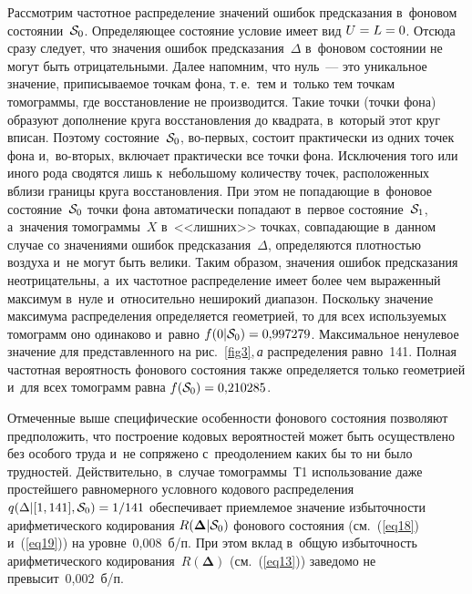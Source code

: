 \begin{multicols}{2}
Рассмотрим частотное распределение значений ошибок предсказания в~фоновом 
состоянии~${\cal S}_0$. Определяющее состояние условие имеет вид $U\hm=L\hm=0$. 
Отсюда сразу следует, что значения ошибок предсказания~$\Delta$  в~фоновом 
состоянии не могут быть отрицательными. Далее напомним, что нуль~--- 
это уникальное значение, приписываемое точкам фона, т.\,е.\ 
тем и~только тем точкам томограммы, где вос\-ста\-нов\-ле\-ние не производится. 
Такие точки (точки фона) образуют дополнение круга восстановления до квадрата, 
в~который этот круг вписан. Поэтому состояние~${\cal S}_0$, во-пер\-вых, 
состоит практически из одних точек фона и,~во-вто\-рых, включает практически 
все точки фона. Исключения того или иного рода сводятся лишь к~небольшому 
количеству точек, расположенных вблизи границы круга восстановления. 
При этом не попадающие в~фоновое состояние~${\cal S}_0$ точки фона автоматически 
попадают в~первое состояние~${\cal S}_1$, а~значения томограммы~$X$ в~<<лишних>> 
точках, совпадающие в~данном случае со значениями ошибок предсказания~$\Delta$, 
определяются плот\-ностью воздуха и~не могут быть велики. Таким образом, значения 
ошибок предсказания неотрицательны, а~их частотное распределение имеет более 
чем выраженный максимум в~нуле и~относительно неширокий диапазон. Поскольку 
значение максимума распределения определяется геометрией, то для всех используемых 
томограмм оно одинаково и~равно $f(0|{\cal S}_0)\hm= 0{,}997279$. 
Максимальное ненулевое значение для представленного на рис.~\ref{fig3},\,\textit{а} 
распределения равно~141. Полная частотная вероятность фонового состояния также 
определяется только геометрией и~для всех томограмм равна $f({\cal S}_0)\hm= 
0{,}210285$.
{

}



Отмеченные выше специфические особенности фонового состояния 
позволяют предположить, что построение кодовых вероятностей может быть 
осуществлено без особого труда и~не сопряжено с~преодолением каких бы то 
ни было трудностей. Действительно, в~случае томограммы~Т1 использование 
даже простейшего равномерного условного кодового распределения 
$q(\Delta|[1,141],{\cal S}_0)\hm=1/141$ обеспечивает приемлемое значение 
избыточности арифметического кодирования $R(\boldsymbol{\Delta}|{\cal S}_0)$ 
фонового состояния (см.~(\ref{eq18}) и~(\ref{eq19})) на уровне~0,008~б/п. 
При этом вклад в~общую избыточность арифметического 
кодирования~$R(\boldsymbol{\Delta})$ (см.~(\ref{eq13})) заведомо не 
превысит~0,002~б/п.


\end{multicols}
